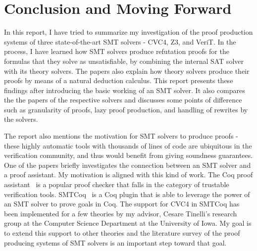 \documentclass{article}
\begin{document}
\section{Conclusion and Moving Forward}
\label{sec:conc}
In this report, I have tried to summarize my investigation
of the proof production systems of three state-of-the-art 
SMT solvers - CVC4, Z3, and VeriT. In the process,
I have learned how SMT solvers produce refutation 
proofs for the formulas that they solve as unsatisfiable, 
by combining the internal SAT solver with its theory
solvers. The papers also explain how theory solvers 
produce their proofs by means of a natural deduction
calculus. This report presents these findings after 
introducing the basic working of an SMT solver. 
It also compares the the papers of the respective 
solvers and discusses some points of difference 
such as granularity of proofs, lazy proof production, 
and handling of rewrites by the solvers.

The report also mentions the motivation for SMT 
solvers to produce proofs - these highly automatic 
tools with thousands of lines of code are ubiquitous 
in the verification community, and thus would 
benefit from giving soundness guarantees. One of 
the papers briefly investigates the connection between 
an SMT solver and a proof assistant. My motivation 
is aligned with this kind of work. The Coq proof 
assistant~\cite{coq} is a popular proof checker 
that falls in the category of trustable verification 
tools. SMTCoq~\cite{DBLP:conf/cav/EkiciMTKKRB17} is a 
Coq plugin that is able to leverage the power of an 
SMT solver to prove goals in Coq. The support 
for CVC4 in SMTCoq has been implemented for a 
few theories by my advisor, Cesare Tinelli's 
research group at the Computer Science Department 
at the University of Iowa. My goal is to extend 
this support to other theories and the literature 
survey of the proof producing systems of SMT solvers
is an important step toward that goal.



\end{document}
